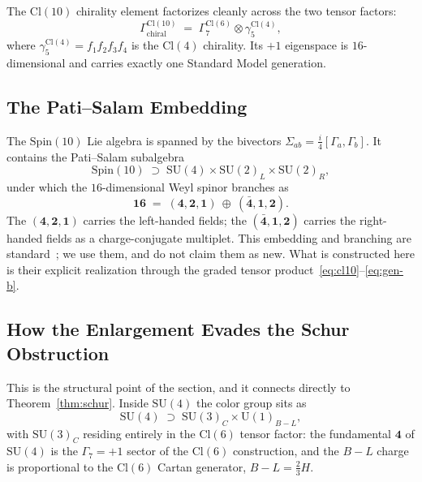 \documentclass[12pt]{article}
\theoremstyle{remark}
\newcommand{\cl}{\mathrm{Cl}}
\newcommand{\spin}{\mathrm{Spin}}
\newcommand{\su}{\mathrm{SU}}
\newcommand{\UU}{\mathrm{U}}
\begin{document}
The $\cl(10)$ chirality element factorizes cleanly across the two tensor
factors:
\begin{equation}
	\Gamma_{\mathrm{chiral}}^{\cl(10)}
	\;=\; \Gamma_7^{\cl(6)}\otimes\gamma_5^{\cl(4)},
	\label{eq:chiral-fact}
\end{equation}
where $\gamma_5^{\cl(4)}=f_1f_2f_3f_4$ is the $\cl(4)$ chirality.  Its $+1$
eigenspace is $16$-dimensional and carries exactly one Standard Model
generation.

\subsection{The Pati--Salam Embedding}
\label{sec:patisalam}

The $\spin(10)$ Lie algebra is spanned by the bivectors
$\Sigma_{ab}=\tfrac{i}{4}[\Gamma_a,\Gamma_b]$.  It contains the Pati--Salam
subalgebra
\begin{equation}
	\spin(10)\;\supset\;\su(4)\times\su(2)_L\times\su(2)_R,
	\label{eq:ps-embed}
\end{equation}
under which the $16$-dimensional Weyl spinor branches as
\begin{equation}
	\mathbf{16} \;=\; (\mathbf{4},\mathbf{2},\mathbf{1})\ \oplus\
	(\bar{\mathbf{4}},\mathbf{1},\mathbf{2}).
	\label{eq:branching}
\end{equation}
The $(\mathbf{4},\mathbf{2},\mathbf{1})$ carries the left-handed fields; the
$(\bar{\mathbf{4}},\mathbf{1},\mathbf{2})$ carries the right-handed fields as a
charge-conjugate multiplet.  This embedding and branching are
standard~\cite{PatiSalam1974,BaezHuerta2010}; we use them, and do not claim them
as new.  What is constructed here is their explicit realization through the
graded tensor product~\eqref{eq:cl10}--\eqref{eq:gen-b}.

\subsection{How the Enlargement Evades the Schur Obstruction}
\label{sec:evasion}

This is the structural point of the section, and it connects directly to
Theorem~\ref{thm:schur}.  Inside $\su(4)$ the color group sits as
\begin{equation}
	\su(4)\;\supset\;\su(3)_C\times\UU(1)_{B-L},
	\label{eq:su4}
\end{equation}
with $\su(3)_C$ residing entirely in the $\cl(6)$ tensor factor: the fundamental
$\mathbf{4}$ of $\su(4)$ is the $\Gamma_7=+1$ sector of the $\cl(6)$
construction, and the $B-L$ charge is proportional to the $\cl(6)$ Cartan
generator, $B-L=\tfrac{2}{3}H$.
\end{document}
